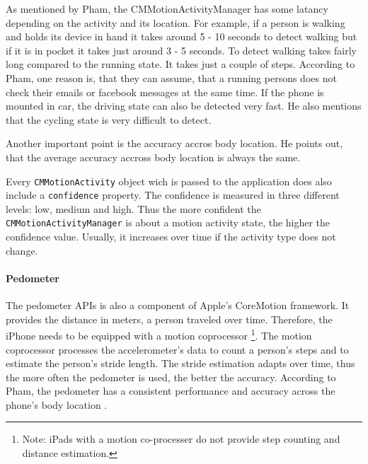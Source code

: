 As mentioned by Pham, the CMMotionActivityManager has some latancy depending on the activity and its location.
For example, if a person is walking and holds its device in hand it takes around 5 - 10 seconds to detect walking but if it is in pocket it takes just around 3 - 5 seconds.
To detect walking takes fairly long compared to the running state.
It takes just a couple of steps. According to Pham, one reason is, that they can assume, that a running persons does not check their emails or facebook messages at the same time.
If the phone is mounted in car, the driving state can also be detected very fast. He also mentions that the cycling state is very difficult to detect.

Another important point is the accuracy accros body location.
He points out, that the average accuracy accross body location is always the same.

Every \texttt{CMMotionActivity} object wich is passed to the application does also include a \texttt{confidence} property.
The confidence is measured in three different levels: low, medium and high.
Thus the more confident the \texttt{CMMotionActivityManager} is about a motion activity state, the higher the confidence value.
Usually, it increases over time if the activity type does not change.


\paragraph{Pedometer}

The pedometer \acsp{API} is also a component of Apple's CoreMotion framework.
It provides the distance in meters, a person traveled over time.
Therefore, the iPhone needs to be equipped with a motion coprocessor \footnote{Note: iPads with a motion co-processer do not provide step counting and distance estimation.}.
The motion coprocessor processes the accelerometer's data to count a person's steps and to estimate the person's stride length.
The stride estimation adapts over time, thus the more often the pedometer is used, the better the accuracy.
According to Pham, the pedometer has a consistent performance and accuracy across the phone's body location \cite{wwdc_2014}.

